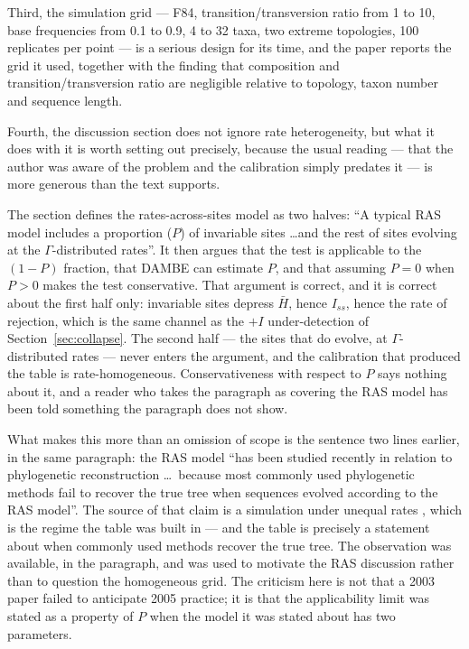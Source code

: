 \documentclass[preprint,12pt,authoryear]{elsarticle}
\newcommand{\Iss}{I_{ss}}
\theoremstyle{definition}
\theoremstyle{remark}
\begin{document}
Third, the simulation grid --- F84, transition/transversion ratio from 1 to 10,
base frequencies from 0.1 to 0.9, 4 to 32 taxa, two extreme topologies, 100
replicates per point --- is a serious design for its time, and the paper reports
the grid it used, together with the finding that composition and
transition/transversion ratio are negligible relative to topology, taxon number
and sequence length.

Fourth, the discussion section does not ignore rate heterogeneity, but what it
does with it is worth setting out precisely, because the usual reading --- that
the author was aware of the problem and the calibration simply predates it ---
is more generous than the text supports.

The section defines the rates-across-sites model as two halves: ``A typical RAS
model includes a proportion ($P$) of invariable sites \ldots and the rest of
sites evolving at the $\Gamma$-distributed rates''. It then argues that the test
is applicable to the $(1-P)$ fraction, that DAMBE can estimate $P$, and that
assuming $P=0$ when $P>0$ makes the test conservative. That argument is correct,
and it is correct about the first half only: invariable sites depress $\bar H$,
hence $\Iss$, hence the rate of rejection, which is the same channel as the
$+I$ under-detection of Section~\ref{sec:collapse}. The second half --- the
sites that do evolve, at $\Gamma$-distributed rates --- never enters the
argument, and the calibration that produced the table is rate-homogeneous.
Conservativeness with respect to $P$ says nothing about it, and a reader who
takes the paragraph as covering the RAS model has been told something the
paragraph does not show.

What makes this more than an omission of scope is the sentence two lines
earlier, in the same paragraph: the RAS model ``has been studied recently in
relation to phylogenetic reconstruction \ldots\ because most commonly used
phylogenetic methods fail to recover the true tree when sequences evolved
according to the RAS model''. The source of that claim is a simulation under
unequal rates \citep{kuhner1994simulation}, which is the regime the table was
built in --- and the table is precisely a statement about when commonly used
methods recover the true tree. The observation was available, in the paragraph,
and was used to motivate the RAS discussion rather than to question the
homogeneous grid. The criticism here is not that a 2003 paper failed to
anticipate 2005 practice; it is that the applicability limit was stated as a
property of $P$ when the model it was stated about has two parameters.
\end{document}
